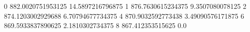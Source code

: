 0 882.0020751953125 14.5897216796875
1 876.7630615234375 9.3507080078125
2 874.1203002929688 6.70794677734375
4 870.9032592773438 3.49090576171875
6 869.5933837890625 2.1810302734375
8 867.412353515625 0.0
